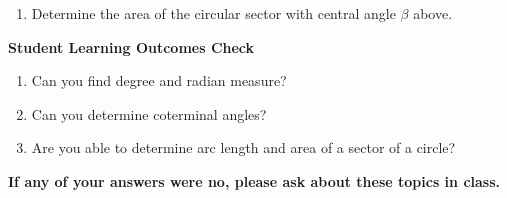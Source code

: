 \begin{enumerate}
\begin{enumerate}

    
    \vfill
    
  \item Determine the area of the circular sector with central angle $\beta$ above.
    \vfill
  \end{enumerate}
\end{enumerate}

\noindent \textbf{Student Learning Outcomes Check}

\begin{enumerate}
\item Can you find degree and radian measure?
\item Can you determine coterminal angles?
\item Are you able to determine arc length and area of a sector of a circle?
\end{enumerate}

\noindent \textbf{If any of your answers were no, please ask about these topics in class.}

